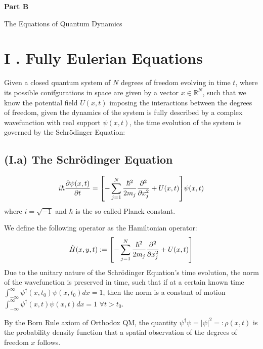 \documentclass[11pt, a4paper]{article} %
\newcommand{\R}{\mathbb{R}} %
\newenvironment{kapituloBerria}[1][]
  {\clearpage           %
   \thispagestyle{empty}%
   \vspace*{\stretch{2}}%
   \raggedleft          %
   {\textbf{{\fontsize{60}{40}\selectfont \hspace{+9.5cm}#1\newline \newline}}}
   \bf
   \fontsize{30}{20}\selectfont
  }
  {\par %
   \vspace{\stretch{3}} %
   \clearpage           %
  }
\begin{document}
\newpage

\begin{kapituloBerria}[Part B]
The Equations of Quantum Dynamics
\end{kapituloBerria}


\section*{I . Fully Eulerian Equations}
Given a closed quantum system of $N$ degrees of freedom evolving in time $t$, where its possible conifgurations in space are given by a vector $x\in\R^N$, such that we know the potential field $U(x, t)$ imposing the interactions between the degrees of freedom, given the dynamics of the system is fully described by a complex wavefunction with real support $\psi(x,t)$, the time evolution of the system is governed by the Schrödinger Equation:

\subsection*{(I.a) The Schrödinger Equation}
\begin{equation}\label{SE}
i\hbar \pdv{\psi(x,t)}{t} = \qty[-\sum_{j=1}^N\frac{\hbar^2}{2m_j}\pdv[2]{}{x_j} + U(x,t)]\psi(x,t)
\end{equation}
where $i=\sqrt{-1}$ and $\hbar$ is the so called Planck constant.

We define the following operator as the Hamiltonian operator:
\begin{equation}
\hat{H}(x, y, t):=\qty[-\sum_{j=1}^N\frac{\hbar^2}{2m_j}\pdv[2]{}{x_j} + U(x,t)]
\end{equation}
Due to the unitary nature of the Schrödinger Equation's time evolution, the norm of the wavefunction is preserved in time, such that if at a certain known time $\int^\infty_{-\infty} \psi^\dagger(x,t_0)\psi(x,t_0)dx=1$, then the norm is a constant of motion $\int^\infty_{-\infty} \psi^\dagger(x,t)\psi(x,t)dx=1$ $\forall t>t_0$.

By the Born Rule axiom of Orthodox QM, the quantity $\psi^\dagger\psi=|\psi|^2=:\rho(x,t)$ is the probability density function that a spatial observation of the degrees of freedom $x$ follows.
\end{document}
